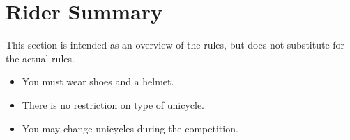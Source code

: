 \section{Rider Summary}

This section is intended as an overview of the rules, but does not substitute for the actual rules.
\begin{itemize}
\item You must wear shoes and a helmet.
\item There is no restriction on type of unicycle.
\item You may change unicycles during the competition.
\end{itemize}
